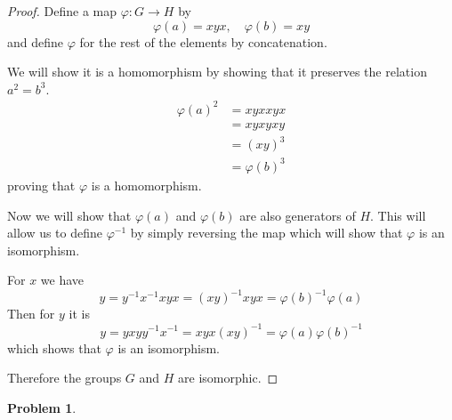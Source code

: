 \documentclass[10pt]{article}
\newcommand{\sk}{\vskip 10mm}
\theoremstyle{plain}
\newtheorem{problem}{Problem}
\theoremstyle{remark}
\begin{document}
\begin{proof}
  Define a map $\varphi:G\rightarrow H$ by
  \[ \varphi(a)=xyx,\quad \varphi(b)=xy\]
  and define $\varphi$ for the rest of the elements by concatenation.

  We will show it is a homomorphism by showing that it preserves the relation
  $a^2=b^3$.
  \begin{align*}
    \varphi(a)^2&= xyxxyx\\
         &= xyxyxy\\
         &= (xy)^3\\
         &= \varphi(b)^3
  \end{align*}
  proving that $\varphi$ is a homomorphism.

  Now we will show that $\varphi(a)$ and $\varphi(b)$ are also generators of $H$. This
  will allow us to define $\varphi^{-1}$ by simply reversing the map which will
  show that $\varphi$ is an isomorphism.

  For $x$ we have
  \[ y = y^{-1}x^{-1}xyx = (xy)^{-1}xyx = \varphi(b)^{-1}\varphi(a)\]
  Then for $y$ it is
  \[ y = yxyy^{-1}x^{-1}=xyx(xy)^{-1} =\varphi(a)\varphi(b)^{-1}\]
  which shows that $\varphi$ is an isomorphism.

  Therefore the groups $G$ and $H$ are isomorphic.
\end{proof}

\sk

\begin{problem} %
  
\end{problem}
\end{document}
